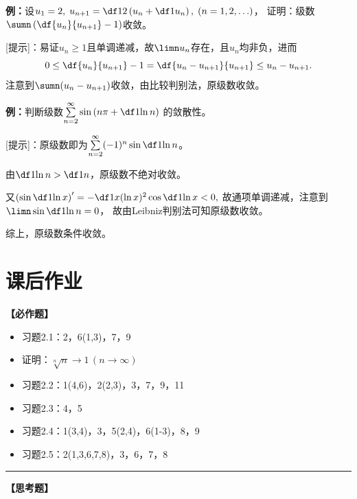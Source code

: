 {\bf 例：}设$u_1=2,\;u_{n+1}=\df12\left(u_n+\df1{u_n}\right),\;(n=1,2,\ldots)$，
证明：级数$\sumn\left(\df{u_n}{u_{n+1}}-1\right)$收敛。

[提示]：易证$u_n\geq 1$且单调递减，故$\limn u_n$存在，且$u_n$均非负，进而
$$0\leq\df{u_n}{u_{n+1}}-1=\df{u_n-u_{n+1}}{u_{n+1}}\leq u_n-u_{n+1}.$$
注意到$\sumn(u_n-u_{n+1})$收敛，由比较判别法，原级数收敛。

{\bf 例：}判断级数$\sum\limits_{n=2}^{\infty}\sin\left(n\pi+\df1{\ln n}\right)$
的敛散性。

[提示]：原级数即为$\sum\limits_{n=2}^{\infty}(-1)^n\sin\df1{\ln n}$。

由$\df1{\ln n}>\df1n$，原级数不绝对收敛。

又$\left(\sin\df1{\ln x}\right)'=-\df1{x(\ln x)^2}\cos\df1{\ln x}<0,$
故通项单调递减，注意到$\limn\sin\df1{\ln n}=0$，
故由Leibniz判别法可知原级数收敛。

综上，原级数条件收敛。

\newpage

\section*{课后作业}

{\bf 【必作题】}

\begin{itemize}
  \item 习题2.1：2，6(1,3)，7，9
  \item 证明：$\sqrt[n]n\to 1\,(n\to\infty)$
  \item 习题2.2：1(4,6)，2(2,3)，3，7，9，11
  \item 习题2.3：4，5
  \item 习题2.4：1(3,4)，3，5(2,4)，6(1-3)，8，9
  \item 习题2.5：2(1,3,6,7,8)，3，6，7，8
\end{itemize}

\bigskip

\hrule

\bigskip
\bigskip

{\bf 【思考题】}

